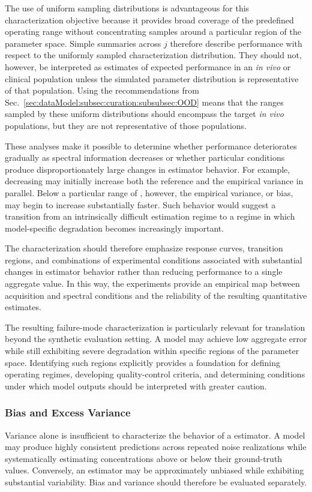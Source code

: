 The use of uniform sampling distributions is advantageous for this characterization objective because it provides broad coverage of the predefined operating range without concentrating samples around a particular region of the parameter space. Simple summaries across $j$ therefore describe performance with respect to the uniformly sampled characterization distribution. They should not, however, be interpreted as estimates of expected performance in an \textit{in vivo} or clinical population unless the simulated parameter distribution is representative of that population. Using the recommendations from Sec.~\ref{sec:dataModel:subsec:curation:subsubsec:OOD} means that the ranges sampled by these uniform distributions should encompass the target \textit{in vivo} populations, but they are not representative of those populations.

These analyses make it possible to determine whether performance deteriorates gradually as spectral information decreases or whether particular conditions produce disproportionately large changes in estimator behavior. For example, decreasing \SNR may initially increase both the \CRLB reference and the empirical \DL variance in parallel. Below a particular range of \SNR, however, the empirical variance, or bias, may begin to increase substantially faster. Such behavior would suggest a transition from an intrinsically difficult estimation regime to a regime in which model-specific degradation becomes increasingly important.

The characterization should therefore emphasize response curves, transition regions, and combinations of experimental conditions associated with substantial changes in estimator behavior rather than reducing performance to a single aggregate value. In this way, the \MC experiments provide an empirical map between acquisition and spectral conditions and the reliability of the resulting quantitative estimates.

The resulting failure-mode characterization is particularly relevant for translation beyond the synthetic evaluation setting. A model may achieve low aggregate error while still exhibiting severe degradation within specific regions of the parameter space. Identifying such regions explicitly provides a foundation for defining operating regimes, developing quality-control criteria, and determining conditions under which model outputs should be interpreted with greater caution.

\subsubsection{Bias and Excess Variance}
\label{sec:Analy&Visual:subsec:infoStand:subsubsec:bias}
Variance alone is insufficient to characterize the behavior of a \DL estimator. A model may produce highly consistent predictions across repeated noise realizations while systematically estimating concentrations above or below their ground-truth values. Conversely, an estimator may be approximately unbiased while exhibiting substantial variability. Bias and variance should therefore be evaluated separately.

